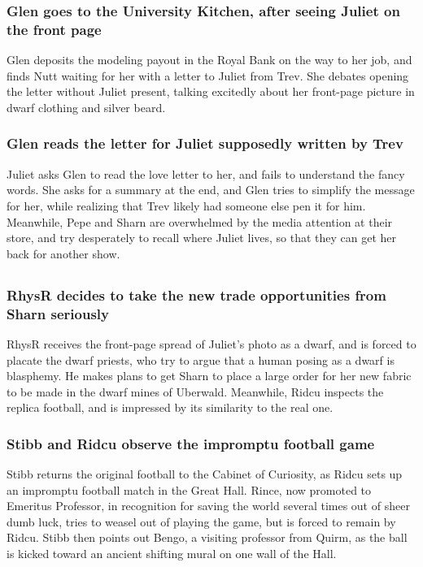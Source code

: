 \subsubsection{\Gls{Glen} goes to the University Kitchen, after seeing \Gls{Juliet} on the front
    page}
\Gls{Glen} deposits the modeling payout in the Royal Bank on the way to her job, and finds
\Gls{Nutt} waiting for her with a letter to \Gls{Juliet} from \Gls{Trev}. She debates opening the
letter without \Gls{Juliet} present, talking excitedly about her front-page picture in dwarf
clothing and silver beard.

\subsubsection{\Gls{Glen} reads the letter for \Gls{Juliet} supposedly written by \Gls{Trev}}
\Gls{Juliet} asks \Gls{Glen} to read the love letter to her, and fails to understand the fancy
words. She asks for a summary at the end, and \Gls{Glen} tries to simplify the message for her,
while realizing that \Gls{Trev} likely had someone else pen it for him. Meanwhile, \Gls{Pepe} and
\Gls{Sharn} are overwhelmed by the media attention at their store, and try desperately to recall
where \Gls{Juliet} lives, so that they can get her back for another show.

\subsection{}
\subsubsection{\Gls{RhysR} decides to take the new trade opportunities from \Gls{Sharn} seriously}
\Gls{RhysR} receives the front-page spread of \Gls{Juliet}'s photo as a dwarf, and is forced to
placate the dwarf priests, who try to argue that a human posing as a dwarf is blasphemy. He makes
plans to get \Gls{Sharn} to place a large order for her new fabric to be made in the dwarf mines of
Uberwald. Meanwhile, \Gls{Ridcu} inspects the replica football, and is impressed by its similarity
to the real one.

\subsubsection{\Gls{Stibb} and \Gls{Ridcu} observe the impromptu football game}
\Gls{Stibb} returns the original football to the Cabinet of Curiosity, as \Gls{Ridcu} sets up an
impromptu football match in the Great Hall. \Gls{Rince}, now promoted to Emeritus Professor, in
recognition for saving the world several times out of sheer dumb luck, tries to weasel out of
playing the game, but is forced to remain by \Gls{Ridcu}. \Gls{Stibb} then points out \Gls{Bengo},
a visiting professor from Quirm, as the ball is kicked toward an ancient shifting mural on one wall
of the Hall.

